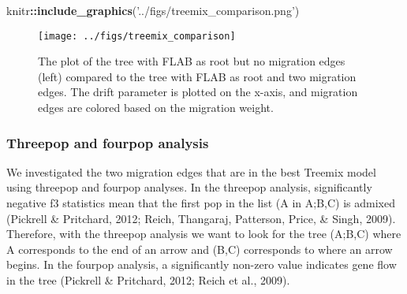 \documentclass[11pt,]{article}
\newenvironment{Shaded}{\begin{snugshade}}{\end{snugshade}}
\newcommand{\KeywordTok}[1]{\textcolor[rgb]{0.13,0.29,0.53}{\textbf{#1}}}
\newcommand{\StringTok}[1]{\textcolor[rgb]{0.31,0.60,0.02}{#1}}
\newcommand{\OperatorTok}[1]{\textcolor[rgb]{0.81,0.36,0.00}{\textbf{#1}}}
\newcommand{\NormalTok}[1]{#1}
\begin{document}
\begin{Shaded}
\begin{Highlighting}[]
\NormalTok{knitr}\OperatorTok{::}\KeywordTok{include_graphics}\NormalTok{(}\StringTok{'../figs/treemix_comparison.png'}\NormalTok{)}
\end{Highlighting}
\end{Shaded}

\begin{figure}[H]
\texttt{[image: ../figs/treemix\_comparison]} \caption{The plot of the tree with FLAB as root but no migration edges (left) compared to the tree with FLAB as root and two migration edges. The drift parameter is plotted on the x-axis, and migration edges are colored based on the migration weight.}\label{fig:treemixCompare}
\end{figure}

\subsubsection{Threepop and fourpop
analysis}\label{threepop-and-fourpop-analysis}

We investigated the two migration edges that are in the best Treemix
model using threepop and fourpop analyses. In the threepop analysis,
significantly negative f3 statistics mean that the first pop in the list
(A in A;B,C) is admixed (Pickrell \& Pritchard, 2012; Reich, Thangaraj,
Patterson, Price, \& Singh, 2009). Therefore, with the threepop analysis
we want to look for the tree (A;B,C) where A corresponds to the end of
an arrow and (B,C) corresponds to where an arrow begins. In the fourpop
analysis, a significantly non-zero value indicates gene flow in the tree
(Pickrell \& Pritchard, 2012; Reich et al., 2009).
\end{document}
